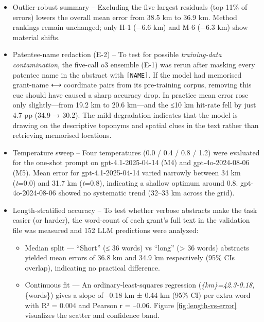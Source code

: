 \begin{itemize}
\item
  Outlier-robust summary -- Excluding the five largest residuals (top
  11\% of errors) lowers the overall mean error from 38.5 km to 36.9 km.
  Method rankings remain unchanged; only H-1 \citep{Bashorun2025_gis}
  (−6.6 km) and M-6 (−6.3 km) show material shifts.
\item
  Patentee-name redaction (E-2) -- To test for possible
  \emph{training-data contamination}, the five-call o3 ensemble (E-1)
  was rerun after masking every patentee name in the abstract with
  \passthrough{\lstinline![NAME]!}. If the model had memorised
  grant-name ⟷ coordinate pairs from its pre-training corpus, removing
  this cue should have caused a sharp accuracy drop. In practice mean
  error rose only slightly---from 19.2 km to 20.6 km---and the ≤10 km
  hit-rate fell by just 4.7 pp (34.9 → 30.2). The mild degradation
  indicates that the model is drawing on the descriptive toponyms and
  spatial clues in the text rather than retrieving memorised locations.
\item
  Temperature sweep -- Four temperatures (0.0 / 0.4 / 0.8 / 1.2) were
  evaluated for the one-shot prompt on gpt-4.1-2025-04-14 (M4) and
  gpt-4o-2024-08-06 (M5). Mean error for gpt-4.1-2025-04-14 varied
  narrowly between 34 km (\emph{t}=0.0) and 31.7 km (\emph{t}=0.8),
  indicating a shallow optimum around 0.8. gpt-4o-2024-08-06 showed no
  systematic trend (32--33 km across the grid).
\item
  Length‐stratified accuracy -- To test whether verbose abstracts make
  the task easier (or harder), the word-count of each grant's full text
  in the validation file was measured and 152 LLM predictions were
  analyzed:

  \begin{itemize}
  \tightlist
  \item
    Median split --- ``Short'' (≤ 36 words) vs ``long'' (\textgreater{}
    36 words) abstracts yielded mean errors of 36.8 km and 34.9 km
    respectively (95\% CIs overlap), indicating no practical
    difference.\\
  \item
    Continuous fit --- An ordinary-least-squares regression
    (\emph{\{km\}=42.3-0.18,}\{words\}) gives a
    slope of --0.18 km ± 0.44 km (95\% CI) per extra word with R² =
    0.004 and Pearson r = --0.06. Figure \ref{fig:length-vs-error}
    visualizes the scatter and confidence band.
  \end{itemize}
\end{itemize}

